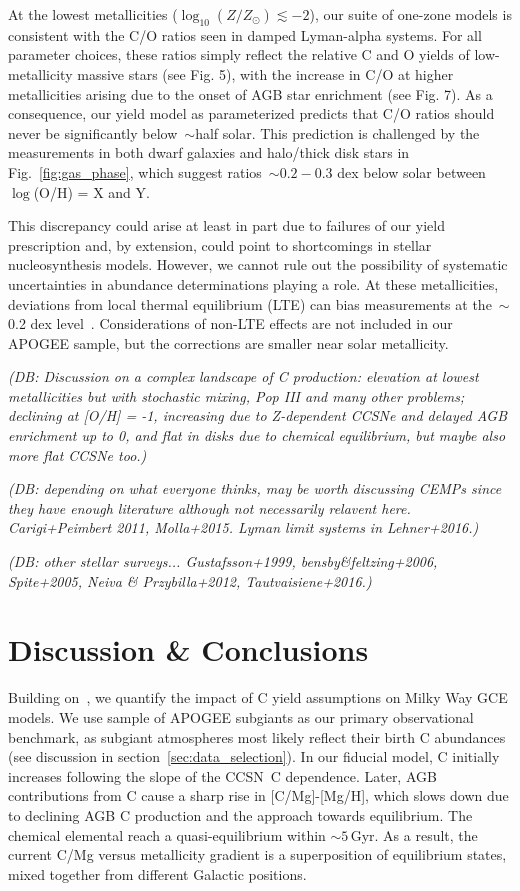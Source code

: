 \documentclass[fleqn,
usenatbib]{mnras}
\makeatletter
\newcommand{\cc}{CCSN}
\newcommand{\caah}{[C/Mg]-[Mg/H]}
\newcommand{\about}[1]{${\sim} #1$}
\DeclareRobustCommand\citepos
  {\begingroup
   \let\NAT@nmfmt\NAT@posfmt%
   \NAT@swafalse\let\NAT@ctype\z@\NAT@partrue
   \@ifstar{\NAT@fulltrue\NAT@citetp}{\NAT@fullfalse\NAT@citetp}}
\let\NAT@orig@nmfmt\NAT@nmfmt
\def\NAT@posfmt#1{\NAT@orig@nmfmt{#1's}}
\newcommand{\dbnote}[1]{ {\color{Thistle} \textit{\small (DB: #1)}} }
\makeatother
\begin{document}
At the lowest metallicities ($\log_{10}(Z / Z_\odot) \lesssim -2$), our suite
of one-zone models is consistent with the C/O ratios seen in damped Lyman-alpha
systems.
For all parameter choices, these ratios simply reflect the relative C and O
yields of low-metallicity massive stars (see Fig. 5), with the increase in C/O
at higher metallicities arising due to the onset of AGB star enrichment (see
Fig. 7).
As a consequence, our yield model as parameterized predicts that C/O ratios
should never be significantly below~$\sim$half solar.
This prediction is challenged by the measurements in both dwarf galaxies and
halo/thick disk stars in Fig.~\ref{fig:gas_phase}, which suggest ratios~$\sim$$0.2 - 0.3$ dex
below solar between~$\log$(O/H) = X and Y.

This discrepancy could arise at least in part due to failures of our yield
prescription and, by extension, could point to shortcomings in stellar
nucleosynthesis models.
However, we cannot rule out the possibility of systematic uncertainties in
abundance determinations playing a role.
At these metallicities, deviations from local thermal equilibrium (LTE) can
bias measurements at the~$\sim$0.2 dex level~\citep[e.g.,][]{amarsi+19}.
Considerations of non-LTE effects are not included in our APOGEE sample, but
the corrections are smaller near solar metallicity.

\dbnote{Discussion on a complex landscape of C production: elevation at lowest metallicities but with stochastic mixing, Pop III and many other problems; declining at [O/H] = -1, increasing due to Z-dependent CCSNe and delayed AGB enrichment up to 0, and flat in disks due to chemical equilibrium, but maybe also more flat CCSNe too.}


\dbnote{depending on what everyone thinks, may be worth discussing CEMPs since they have enough literature although not necessarily relavent here. Carigi+Peimbert 2011, Molla+2015. Lyman limit systems in Lehner+2016.}


\dbnote{other stellar surveys...
Gustafsson+1999, bensby\&feltzing+2006, Spite+2005, Neiva \& Przybilla+2012, Tautvaisiene+2016.}



\section{Discussion \& Conclusions}\label{sec:conclusions}


Building on~\citet{james+23}, we quantify the impact of C yield assumptions on Milky Way GCE models. We use \citepos{jack} sample of APOGEE subgiants as our primary observational benchmark, as subgiant atmospheres most likely reflect their birth C abundances (see discussion in section~\ref{sec:data_selection}).
In our fiducial model, C initially increases following the slope of the \cc\ C dependence. Later, AGB contributions from C cause a sharp rise in \caah, which slows down due to declining AGB C production and the approach towards equilibrium. The chemical elemental reach a quasi-equilibrium within \about{5}\,Gyr. As a result, the current C/Mg versus metallicity gradient is a superposition of equilibrium states, mixed together from different Galactic positions.
\end{document}
